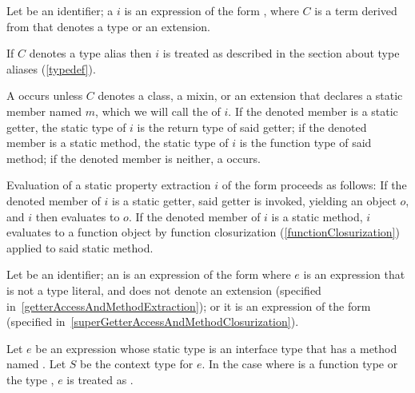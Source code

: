 \documentclass[makeidx]{article}
\begin{document}
{\LMHash{}%
%
Let \id{} be an identifier;
a 
$i$ is an expression of the form ,
where $C$ is a term derived from  that denotes
a type or an extension.

\LMHash{}%
If $C$ denotes a type alias then $i$ is treated as described
in the section about type aliases
(\ref{typedef}).

\LMHash{}%
A  occurs
unless $C$ denotes a class, a mixin, or an extension that declares
a static member named $m$,
which we will call the
of $i$.
If the denoted member is a static getter,
the static type of $i$ is the return type of said getter;
if the denoted member is a static method,
the static type of $i$ is the function type of said method;
if the denoted member is neither, a  occurs.

\LMHash{}%
Evaluation of a static property extraction $i$ of the form 
proceeds as follows:
If the denoted member of $i$ is a static getter,
said getter is invoked, yielding an object $o$,
and $i$ then evaluates to $o$.
If the denoted member of $i$ is a static method,
$i$ evaluates to a function object by function closurization
(\ref{functionClosurization})
applied to said static method.
\EndCase

\LMHash{}%
Let \id{} be an identifier;
an 
is an expression of the form 
where $e$ is an expression that is not a type literal,
and does not denote an extension
(specified in~\ref{getterAccessAndMethodExtraction});
or it is an expression of the form 
(specified in~\ref{superGetterAccessAndMethodClosurization}).
\EndCase

\LMHash{}%
Let $e$ be an expression whose static type is
an interface type that has a method named \CALL.
Let $S$ be the context type for $e$.
In the case where  is a function type or the type \FUNCTION,
$e$ is treated as .

\EndCase


}
\end{document}
